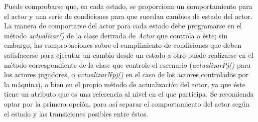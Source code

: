 Puede comprobarse que, en cada estado, se proporciona un comportamiento para el actor y una serie de condiciones para que sucedan cambios de estado del actor. La manera de comportarse del actor para cada estado debe programarse en el método \emph{actualizar()} de la clase derivada de \emph{Actor} que controla a éste; sin embargo, las comprobaciones sobre el cumplimiento de condiciones que deben satisfacerse para ejecutar un cambio desde un estado a otro puede realizarse en el método correspondiente de la clase que controle el escenario (\emph{actualizarPj()} para los actores jugadores, o \emph{actualizarNpj()} en el caso de los actores controlados por la máquina), o bien en el propio método de actualización del actor, ya que éste tiene un atributo que es una referencia al nivel en el que participa. Se recomienda optar por la primera opción, para así separar el comportamiento del actor según el estado y las transiciones posibles entre éstos.

